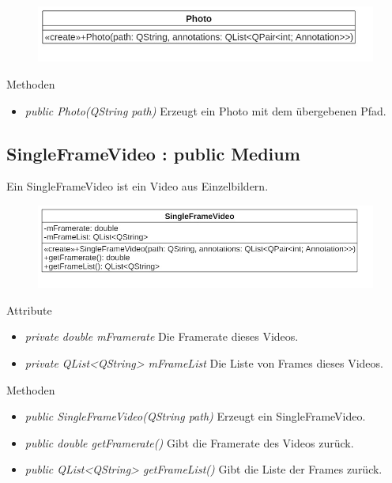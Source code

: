 \begin{figure}[H]
\centering
\includegraphics[scale=0.5]{img/Klassendiagramm/Klassen/Model/Photo}
\label{fig:photo}
\end{figure}

Methoden
\begin{itemize}
\item \textit{public Photo(QString path)} Erzeugt ein Photo mit dem übergebenen Pfad.
\end{itemize}

\subsection*{SingleFrameVideo : public Medium}
Ein SingleFrameVideo ist ein Video aus Einzelbildern.

\begin{figure}[H]
\centering
\includegraphics[scale=0.5]{img/Klassendiagramm/Klassen/Model/SingleFrameVideo}
\label{fig:singleFrameVideo}
\end{figure}

Attribute
\begin{itemize}
\item\textit{private double mFramerate} Die Framerate dieses Videos.
\item\textit{private QList<QString> mFrameList} Die Liste von Frames dieses Videos.
\end{itemize}

Methoden
\begin{itemize}
\item \textit{public SingleFrameVideo(QString path)} Erzeugt ein SingleFrameVideo.
\item \textit{public double getFramerate()} Gibt die Framerate des Videos zurück.
\item \textit{public QList<QString> getFrameList()} Gibt die Liste der Frames zurück.
\end{itemize}

